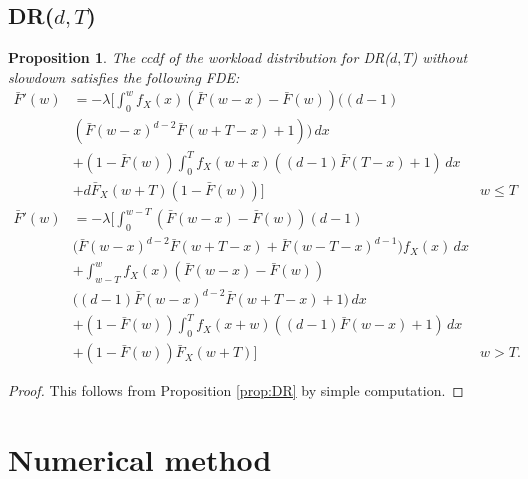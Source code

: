 \documentclass[12pt]{report}
\newtheorem{proposition}[theorem]{Proposition}
\begin{document}
\subsection{DR($d,T$)}
\begin{proposition}
	The ccdf of the workload distribution for DR($d,T$) without slowdown satisfies the following FDE:
	\begin{align*}
		\bar F'(w)
		&=
		-\lambda \bigg[ \int_0^w f_X(x) (\bar F(w-x) - \bar F(w)) \big((d-1)\\
		&(\bar F(w-x)^{d-2} \bar F(w+T-x) + 1)\big) \, dx&\\
		&+ (1-\bar F(w))
		\int_0^T f_X(w+x) ((d-1)\bar F(T-x) + 1)\, dx &\\
		&+ d \bar F_X(w+T) (1-\bar F(w)) \bigg] & w \leq T\\
		\bar F'(w)
		&= - \lambda \bigg[ \int_0^{w-T} (\bar F(w-x) - \bar F(w)) (d-1)&\\ &\big(\bar F(w-x) ^{d-2} \bar F(w+T-x) + \bar F(w-T-x)^{d-1} \big) f_X(x) \, dx&\\
		&+ \int_{w-T}^w f_X(x) (\bar F(w-x) - \bar F(w) )&\\
		 &\big((d-1) \bar F(w-x)^{d-2} \bar F(w+T-x) + 1 \big) \, dx&\\
		 &+ (1-\bar F(w)) \int_0^T f_X(x+w)
		((d-1) \bar F(w-x) + 1)\, dx &\\ &+(1-\bar F(w)) \bar F_X(w+T) \bigg] & w > T.
	\end{align*}
\end{proposition}
\begin{proof}
	This follows from Proposition \ref{prop:DR} by simple computation.
\end{proof}

\section{Numerical method} \label{sec:num_method}
\end{document}
